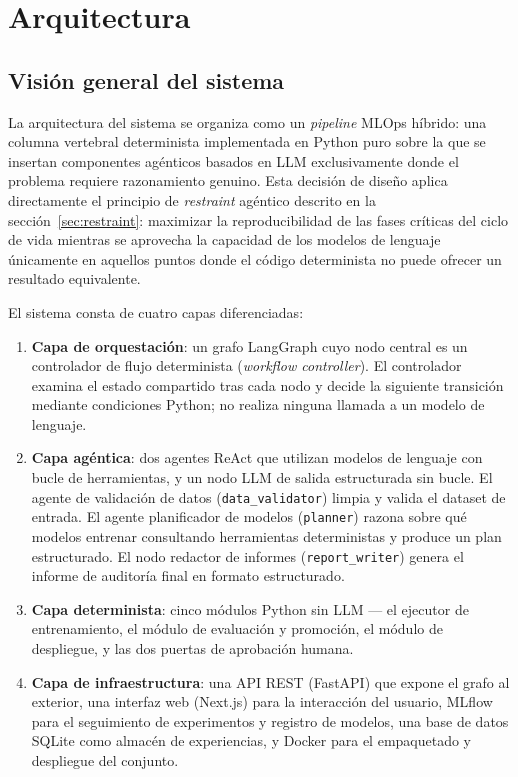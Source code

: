 \section{Arquitectura}
\label{sec:arquitectura}

\subsection{Visión general del sistema}
\label{sec:vision-general}

La arquitectura del sistema se organiza como un \emph{pipeline} MLOps híbrido: una columna vertebral determinista implementada en Python puro sobre la que se insertan componentes agénticos basados en LLM exclusivamente donde el problema requiere razonamiento genuino. Esta decisión de diseño aplica directamente el principio de \emph{restraint} agéntico descrito en la sección~\ref{sec:restraint}: maximizar la reproducibilidad de las fases críticas del ciclo de vida mientras se aprovecha la capacidad de los modelos de lenguaje únicamente en aquellos puntos donde el código determinista no puede ofrecer un resultado equivalente.

El sistema consta de cuatro capas diferenciadas:

\begin{enumerate}
  \item \textbf{Capa de orquestación}: un grafo LangGraph cuyo nodo central es un controlador de flujo determinista (\emph{workflow controller}). El controlador examina el estado compartido tras cada nodo y decide la siguiente transición mediante condiciones Python; no realiza ninguna llamada a un modelo de lenguaje.
  \item \textbf{Capa agéntica}: dos agentes ReAct que utilizan modelos de lenguaje con bucle de herramientas, y un nodo LLM de salida estructurada sin bucle. El agente de validación de datos (\texttt{data\_validator}) limpia y valida el dataset de entrada. El agente planificador de modelos (\texttt{planner}) razona sobre qué modelos entrenar consultando herramientas deterministas y produce un plan estructurado. El nodo redactor de informes (\texttt{report\_writer}) genera el informe de auditoría final en formato estructurado.
  \item \textbf{Capa determinista}: cinco módulos Python sin LLM --- el ejecutor de entrenamiento, el módulo de evaluación y promoción, el módulo de despliegue, y las dos puertas de aprobación humana.
  \item \textbf{Capa de infraestructura}: una API REST (FastAPI) que expone el grafo al exterior, una interfaz web (Next.js) para la interacción del usuario, MLflow para el seguimiento de experimentos y registro de modelos, una base de datos SQLite como almacén de experiencias, y Docker para el empaquetado y despliegue del conjunto.
\end{enumerate}

